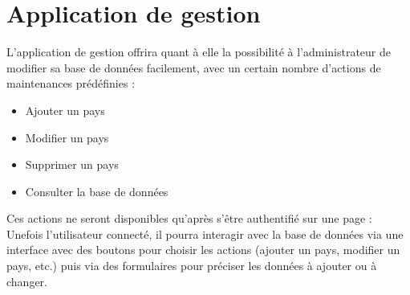 \documentclass[12pt,a4paper,article]{memoir} %
\begin{document}
\section{Application de gestion}
L’application de gestion offrira quant à elle la possibilité à l’administrateur de modifier sa base
de données facilement, avec un certain nombre d’actions de maintenances prédéfinies :
\begin{itemize}
\item Ajouter un pays
\item Modifier un pays
\item Supprimer un pays
\item Consulter la base de données
\end{itemize}
Ces actions ne seront disponibles qu’après s’être authentifié sur une page :
Unefois l’utilisateur connecté, il pourra interagir avec la base de données via une interface
avec des boutons pour choisir les actions (ajouter un pays, modifier un pays, etc.) puis via des
formulaires pour préciser les données à ajouter ou à changer.
\end{document}
